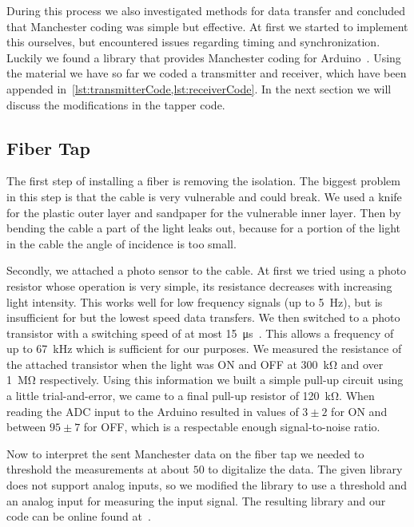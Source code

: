 \documentclass[11pt,twoside,a4paper]{scrartcl}
\begin{document}
		During this process we also investigated methods for data transfer and concluded that Manchester coding was simple but effective.
		At first we started to implement this ourselves, but encountered issues regarding timing and synchronization.
		Luckily we found a library that provides Manchester coding for Arduino~\cite{manchestercoding}.
		Using the material we have so far we coded a transmitter and receiver, which have been appended in~\cref{lst:transmitterCode,lst:receiverCode}.
		In the next section we will discuss the modifications in the tapper code.

	\subsection{Fiber Tap}
		The first step of installing a fiber is removing the isolation.
		The biggest problem in this step is that the cable is very vulnerable and could break.
		We used a knife for the plastic outer layer and sandpaper for the vulnerable inner layer.
		Then by bending the cable a part of the light leaks out,
		because for a portion of the light in the cable the angle of incidence is too small.

		Secondly, we attached a photo sensor to the cable.
		At first we tried using a photo resistor whose operation is very simple,
		its resistance decreases with increasing light intensity.
		This works well for low frequency signals (up to \SI{5}{\hertz}),
		but is insufficient for but the lowest speed data transfers.
		We then switched to a photo transistor with a switching speed of at most \SI{15}{\micro\second}~\cite{phototransistor}.
		This allows a frequency of up to \SI{67}{\kilo\hertz} which is sufficient for our purposes.
		We measured the resistance of the attached transistor when the light was ON and OFF
		at \SI{300}{\kilo\ohm} and over \SI{1}{\mega\ohm} respectively.
		Using this information we built a simple pull-up circuit using a little trial-and-error,
		we came to a final pull-up resistor of \SI{120}{\kilo\ohm}.
		When reading the ADC input to the Arduino resulted in values of $3 \pm 2$ for ON and between $95 \pm 7$ for OFF,
		which is a respectable enough signal-to-noise ratio.

		Now to interpret the sent Manchester data on the fiber tap we needed to threshold the measurements
		at about $50$ to digitalize the data.
		The given library does not support analog inputs, so we modified the library to use
		a threshold and an analog input for measuring the input signal.
		The resulting library and our code can be online found at~\cite{analogmanchestercoding}.
\end{document}
